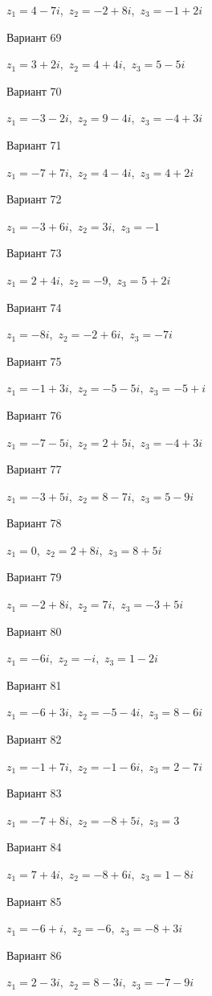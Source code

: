 \documentclass[11pt]{report}
\begin{document}
$z_1 = 4 - 7 i$,\ $z_2 = -2 + 8 i$,\ $z_3 = -1 + 2 i$

Вариант 69

$z_1 = 3 + 2 i$,\ $z_2 = 4 + 4 i$,\ $z_3 = 5 - 5 i$

Вариант 70

$z_1 = -3 - 2 i$,\ $z_2 = 9 - 4 i$,\ $z_3 = -4 + 3 i$

Вариант 71

$z_1 = -7 + 7 i$,\ $z_2 = 4 - 4 i$,\ $z_3 = 4 + 2 i$

Вариант 72

$z_1 = -3 + 6 i$,\ $z_2 = 3 i$,\ $z_3 = -1$

Вариант 73

$z_1 = 2 + 4 i$,\ $z_2 = -9$,\ $z_3 = 5 + 2 i$

Вариант 74

$z_1 = - 8 i$,\ $z_2 = -2 + 6 i$,\ $z_3 = - 7 i$

Вариант 75

$z_1 = -1 + 3 i$,\ $z_2 = -5 - 5 i$,\ $z_3 = -5 + i$

Вариант 76

$z_1 = -7 - 5 i$,\ $z_2 = 2 + 5 i$,\ $z_3 = -4 + 3 i$

Вариант 77

$z_1 = -3 + 5 i$,\ $z_2 = 8 - 7 i$,\ $z_3 = 5 - 9 i$

Вариант 78

$z_1 = 0$,\ $z_2 = 2 + 8 i$,\ $z_3 = 8 + 5 i$

Вариант 79

$z_1 = -2 + 8 i$,\ $z_2 = 7 i$,\ $z_3 = -3 + 5 i$

Вариант 80

$z_1 = - 6 i$,\ $z_2 = - i$,\ $z_3 = 1 - 2 i$

Вариант 81

$z_1 = -6 + 3 i$,\ $z_2 = -5 - 4 i$,\ $z_3 = 8 - 6 i$

Вариант 82

$z_1 = -1 + 7 i$,\ $z_2 = -1 - 6 i$,\ $z_3 = 2 - 7 i$

Вариант 83

$z_1 = -7 + 8 i$,\ $z_2 = -8 + 5 i$,\ $z_3 = 3$

Вариант 84

$z_1 = 7 + 4 i$,\ $z_2 = -8 + 6 i$,\ $z_3 = 1 - 8 i$

Вариант 85

$z_1 = -6 + i$,\ $z_2 = -6$,\ $z_3 = -8 + 3 i$

Вариант 86

$z_1 = 2 - 3 i$,\ $z_2 = 8 - 3 i$,\ $z_3 = -7 - 9 i$
\end{document}
